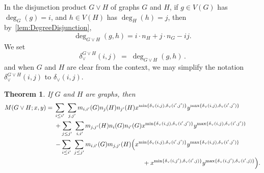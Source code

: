 \documentclass[letterpaper,12pt]{article}
\newtheorem{theorem}{Theorem}[section]
\begin{document}
In the disjunction product $G\vee H$ of graphs $G$ and $H$, if $g\in V(G)$ has $\deg_G(g)=i$, and $h\in V(H)$ has $\deg_H(h)=j$, then by~\eqref{lem:DegreeDisjunction}, 
\begin{equation*}
    \deg_{G\vee H}(g,h) = i\cdot n_H+j\cdot n_G - ij.
\end{equation*}
We set 
$$\delta_{\vee}^{G\vee H}(i,j)\;=\;\deg_{G\vee H}(g,h)\,.$$
and when $G$ and $H$ are clear from the context, we may simplify the notation $\delta_{\vee}^{G\vee H}(i,j)$ to $\delta_{\vee}(i,j)$. 

\begin{theorem}
\label{prop:M-disjunction}
If $G$ and $H$ are graphs, then 
\begin{equation}\label{eq:MPolyDisjunction}
    \begin{aligned}
M(G\vee H;x,y)
={}&
\sum_{i\le i'}\ \sum_{j,j'}
m_{i,i'}(G) n_j(H) n_{j'}(H) 
x^{\min\{\delta_\vee(i,j), \delta_\vee(i',j')\}}
y^{\max\{\delta_\vee(i,j), \delta_\vee(i',j')\}}
\\
&+
\sum_{j\le j'}\ \sum_{i,i'}
m_{j,j'}(H) n_i(G) n_{i'}(G) 
x^{\min\{\delta_\vee(i,j), \delta_\vee(i',j')\}}
y^{\max\{\delta_\vee(i,j), \delta_\vee(i',j')\}}
\\
&-
\sum_{i\le i'}\ \sum_{j\le j'}
m_{i,i'}(G) m_{j,j'}(H) 
\Bigl(
x^{\min\{\delta_\vee(i,j), \delta_\vee(i',j')\}}
y^{\max\{\delta_\vee(i,j), \delta_\vee(i',j')\}}
\\
&\hspace{50mm}+
x^{\min\{\delta_\vee(i,j'), \delta_\vee(i',j)\}}
y^{\max\{\delta_\vee(i,j'), \delta_\vee(i',j)\}}
\Bigr).
\end{aligned}
\end{equation}
\end{theorem}
\end{document}
